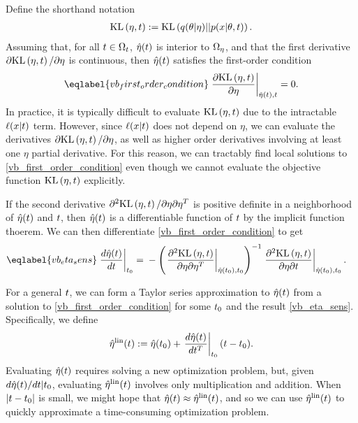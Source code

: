 Define the shorthand notation
%
\begin{align*}
%
\KL{\eta, \t} := \KL{\q(\theta \vert \eta) || p(\x \vert \theta, \t)}.
%
\end{align*}
%
Assuming that, for all $t \in \Omega_{t}$, $\hat\eta(t)$ is interior to $\Omega_{\eta}$,
and that the first derivative $\partial \mathrm{KL}\left(\eta, t\right)/ \partial \eta$ is
continuous, then $\hat\eta(t)$ satisfies the first-order condition
%
\begin{align}\eqlabel{vb_first_order_condition}
%
\fracat{\partial \KL{\eta, \t}}{ \partial \eta}{\etaopt(\t), \t} = 0.
%
\end{align}
%
In practice, it is typically difficult to evaluate $\mathrm{KL}\left(\eta, t\right)$ due to the
intractable $\ell(x \vert t)$ term.  However, since $\ell(x \vert t)$ does
not depend on $\eta$, we can evaluate the derivatives $\partial \mathrm{KL}\left(\eta, t\right) /
\partial \eta$, as well as higher order derivatives involving at least one
$\eta$ partial derivative.  For this reason, we can tractably find local
solutions to \eqref{vb_first_order_condition} even though we cannot evaluate the
objective function $\mathrm{KL}\left(\eta, t\right)$ explicitly.

If the second derivative $\partial^2 \mathrm{KL}\left(\eta, t\right)/ \partial \eta \partial
\eta^T$ is positive definite in a neighborhood of $\hat\eta(t)$ and $t$, then
$\hat\eta(t)$ is a differentiable function of $t$ by the implicit function
thoerem.  We can then differentiate \eqref{vb_first_order_condition} to get
%
\begin{align}\eqlabel{vb_eta_sens}
%
\fracat{d \etaopt(\t)}{d \t}{\t_0} ={}&
    - \left( \fracat{\partial^2 \KL{\eta, \t}}
                    {\partial \eta \partial \eta^T}
                    {\etaopt(\t_0), \t_0} \right)^{-1}
    \fracat{\partial^2 \KL{\eta, \t}}
           {\partial \eta \partial \t}
           {\etaopt(\t_0), \t_0}.
%
\end{align}

For a general $t$, we can form a Taylor series approximation to $\hat\eta(t)$
from a solution to \eqref{vb_first_order_condition} for some $t_0$ and the
result \eqref{vb_eta_sens}.  Specifically, we define
%
\begin{align*}
%
\etalin(\t) := \etaopt(\t_0) + \fracat{d \etaopt(\t)}{d \t^T}{\t_0} (\t - \t_0).
%
\end{align*}
%
Evaluating $\hat\eta(t)$ requires solving a new optimization problem, but, given
$d\hat\eta(t) / dt | t_0$, evaluating $\hat\eta^{\mathrm{lin}}(t)$ involves only
multiplication and addition.  When $|t - t_0|$ is small, we might hope
that $\hat\eta(t) \approx \hat\eta^{\mathrm{lin}}(t)$, and so we can use $\hat\eta^{\mathrm{lin}}(t)$
to quickly approximate a time-consuming optimization problem.



